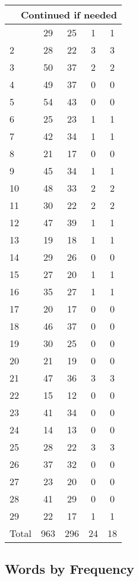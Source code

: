 \begin{center}
\begin{longtable}{l|c|c|c|c}
\hline \multicolumn{5}{|r|}{{Continued if needed}} \\ \hline
\endfoot 
1 & 29 & 25 & 1 & 1\\ \hline
2 & 28 & 22 & 3 & 3\\ \hline
3 & 50 & 37 & 2 & 2\\ \hline
4 & 49 & 37 & 0 & 0\\ \hline
5 & 54 & 43 & 0 & 0\\ \hline
6 & 25 & 23 & 1 & 1\\ \hline
7 & 42 & 34 & 1 & 1\\ \hline
8 & 21 & 17 & 0 & 0\\ \hline
9 & 45 & 34 & 1 & 1\\ \hline
10 & 48 & 33 & 2 & 2\\ \hline
11 & 30 & 22 & 2 & 2\\ \hline
12 & 47 & 39 & 1 & 1\\ \hline
13 & 19 & 18 & 1 & 1\\ \hline
14 & 29 & 26 & 0 & 0\\ \hline
15 & 27 & 20 & 1 & 1\\ \hline
16 & 35 & 27 & 1 & 1\\ \hline
17 & 20 & 17 & 0 & 0\\ \hline
18 & 46 & 37 & 0 & 0\\ \hline
19 & 30 & 25 & 0 & 0\\ \hline
20 & 21 & 19 & 0 & 0\\ \hline
21 & 47 & 36 & 3 & 3\\ \hline
22 & 15 & 12 & 0 & 0\\ \hline
23 & 41 & 34 & 0 & 0\\ \hline
24 & 14 & 13 & 0 & 0\\ \hline
25 & 28 & 22 & 3 & 3\\ \hline
26 & 37 & 32 & 0 & 0\\ \hline
27 & 23 & 20 & 0 & 0\\ \hline
28 & 41 & 29 & 0 & 0\\ \hline
29 & 22 & 17 & 1 & 1\\ \hline
\hline \hline
Total & 963 & 296 & 24 & 18



\end{longtable}
\end{center}

 
\subsection{Words by Frequency}

